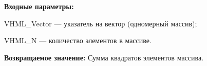\textbf{Входные параметры:}

 VHML\_Vector --- указатель на вектор (одномерный массив);
 
 VHML\_N --- количество элементов в массиве.

\textbf{Возвращаемое значение:}
Сумма квадратов элементов массива.
